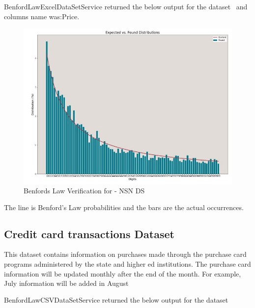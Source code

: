 BenfordLawExcelDataSetService returned the below
output for the dataset~\cite{hid-sp18-514-excelDatalocation}
and columns name was:Price.

\begin{figure}[!ht]
\centering\includegraphics[width=\columnwidth]{images/benford_nsn.JPG}
  \caption{Benfords Law Verification for - NSN DS}\label{f:NSN-ds-benfordlaw}
\end{figure}

The line is Benford’s Law probabilities and the bars are 
the actual occurrences.


\subsection{Credit card transactions Dataset}
This dataset contains information on purchases made through 
the purchase card programs administered by the state and higher 
ed institutions. The purchase card information will be updated monthly 
after the end of the month. For example, July information will 
be added in August~\cite{hid-sp18-514-purchase-card-desc}

BenfordLawCSVDataSetService returned the below
output for the dataset~\cite{hid-sp18-514-purchase-card-ds}


